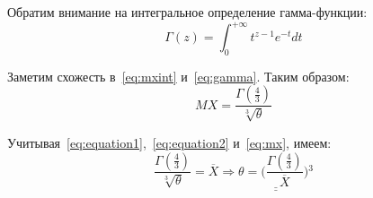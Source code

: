 Обратим внимание на интегральное определение гамма-функции:
\begin{equation} \label{eq:gamma}
    \Gamma(z) = \int^{+\infty}_0 t^{z - 1} e^{-t} dt
\end{equation}

Заметим схожесть в~\ref{eq:mxint} и~\ref{eq:gamma}. Таким образом:
\begin{equation} \label{eq:mx}
    MX = \frac{\Gamma(\frac{4}{3})}{\sqrt[3]{\theta}}
\end{equation}

Учитывая~\ref{eq:equation1},~\ref{eq:equation2} и~\ref{eq:mx}, имеем:
\begin{equation*}
    \frac{\Gamma(\frac{4}{3})}{\sqrt[3]{\theta}} = \overline{X} \Rightarrow
    \underline{\underline{\theta = \Big(\frac{\Gamma(\frac{4}{3})}{\overline{X}}\Big){}^3}}
\end{equation*}

